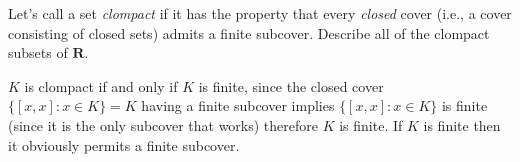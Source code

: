 \begin{exercise}
  Let's call a set \emph{clompact} if it has the property that every \emph{closed} cover (i.e., a cover consisting of closed sets) admits a finite subcover. Describe all of the clompact subsets of $\mathbf{R}$.
\end{exercise}

\begin{solution}
  $K$ is clompact if and only if $K$ is finite, since the closed cover $\{[x,x] : x \in K\} = K$ having a finite subcover implies $\{[x,x] : x \in K\}$ is finite (since it is the only subcover that works) therefore $K$ is finite. If $K$ is finite then it obviously permits a finite subcover.
\end{solution}

